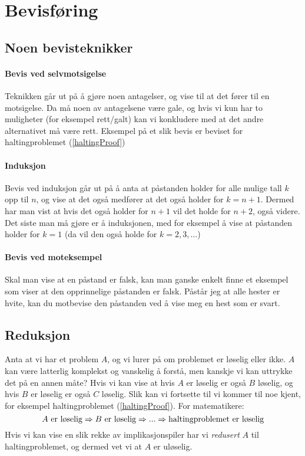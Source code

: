\section{Bevisføring}
\subsection{Noen bevisteknikker}
\paragraph{Bevis ved selvmotsigelse}
Teknikken går ut på å gjøre noen antagelser, og vise til at det fører til en motsigelse. Da må noen av antagelsene være gale, og hvis vi kun har to muligheter (for eksempel rett/galt) kan vi konkludere med at det andre alternativet må være rett. Eksempel på et slik bevis er beviset for haltingproblemet (\ref{haltingProof})

\paragraph{Induksjon}
Bevis ved induksjon går ut på å anta at påstanden holder for alle mulige tall $ k $ opp til $ n $, og vise at det også medfører at det også holder for $ k = n+1 $. Dermed har man vist at hvis det også holder for $ n+1 $ vil det holde for $ n+2 $, også videre. Det siste man må gjøre er å  induksjonen, med for eksempel å vise at påstanden holder for $ k=1 $ (da vil den også holde for $ k=2, 3, ... $)

\paragraph{Bevis ved moteksempel}
Skal man vise at en påstand er falsk, kan man ganske enkelt finne et eksempel som viser at den opprinnelige påstanden er falsk. Påstår jeg at alle hester er hvite, kan du motbevise den påstanden ved å vise meg en hest som er svart.



\subsection{Reduksjon}
Anta at vi har et problem $ A $, og vi lurer på om problemet er løselig eller ikke. $ A $ kan være latterlig komplekst og vanskelig å forstå, men kanskje vi kan uttrykke det på en annen måte? Hvis vi kan vise at hvis $ A $ er løselig er også $ B $ løselig, og hvis $ B $ er løselig er også $ C $ løselig. Slik kan vi fortsette til vi kommer til noe kjent, for eksempel haltingproblemet (\ref{haltingProof}). For matematikere:
\[ \text{$ A $ er løselig} \Rightarrow \text{$ B $ er løselig} \Rightarrow ... \Rightarrow \text{haltingproblemet er løselig} \]
Hvis vi kan vise en slik rekke av implikasjonspiler har vi \emph{redusert} $ A $ til haltingproblemet, og dermed vet vi at $ A $ er uløselig.  

